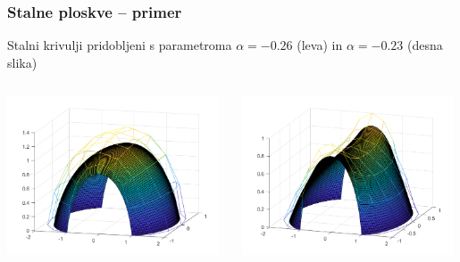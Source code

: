 \documentclass{beamer}
\begin{document}
\begin{frame}
    \frametitle{Stalne ploskve -- primer}
    Stalni krivulji pridobljeni s parametroma $\alpha = -0.26$ (leva) in $\alpha = -0.23$ (desna slika)
    \begin{columns}[c]
		\begin{column}{0.5\textwidth}
			\includegraphics[width=0.98\textwidth]{square_26.png}
		\end{column}
		\begin{column}{0.5\textwidth}
			\includegraphics[width=0.98\textwidth]{square_23.png}
		\end{column}
	\end{columns}
\end{frame}
\end{document}
